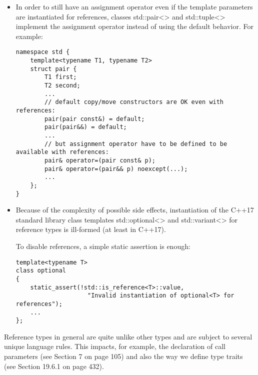 \begin{itemize}
\item 
In order to still have an assignment operator even if the template parameters are instantiated for references, classes std::pair<> and std::tuple<> implement the assignment operator instead of using the default behavior. For example:

\begin{lstlisting}[style=styleCXX]
namespace std {
	template<typename T1, typename T2>
	struct pair {
		T1 first;
		T2 second;
		...
		// default copy/move constructors are OK even with references:
		pair(pair const&) = default;
		pair(pair&&) = default;
		...
		// but assignment operator have to be defined to be available with references:
		pair& operator=(pair const& p);
		pair& operator=(pair&& p) noexcept(...);
		...
	};
}
\end{lstlisting}

\item 
Because of the complexity of possible side effects, instantiation of the C++17 standard library class templates std::optional<> and std::variant<> for reference types is ill-formed (at least in C++17).

To disable references, a simple static assertion is enough:

\begin{lstlisting}[style=styleCXX]
template<typename T>
class optional
{
	static_assert(!std::is_reference<T>::value,
					"Invalid instantiation of optional<T> for references");
	...
};
\end{lstlisting}

\end{itemize}

Reference types in general are quite unlike other types and are subject to several unique language rules. This impacts, for example, the declaration of call parameters (see Section 7 on page 105) and also the way we define type traits (see Section 19.6.1 on page 432).















